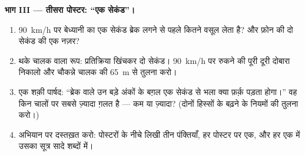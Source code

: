 \begin{problem}[{सप्ताहांत समस्या --- कक्षा क़स्बे का सड़क-सुरक्षा
अभियान बनाती है; सूत्र से जाँचे गए पोस्टर; महापौर के मुश्किल
सवाल}]
\medskip\noindent\textbf{भाग III --- तीसरा पोस्टर: ``एक सेकंड''।}
\begin{enumerate}[resume]
  \item \qty{90}{km/h} पर बेध्यानी का एक सेकंड ब्रेक लगने से पहले
        कितने  वसूल लेता है? और फ़ोन की दो सेकंड की एक नज़र?
  \item थके चालक वाला रूप: प्रतिक्रिया खिंचकर दो सेकंड। \qty{90}{km/h}
        पर रुकने की पूरी दूरी दोबारा निकालो और चौकन्ने चालक की
        \qty{65}{m} से तुलना करो।
  \item एक शक़ी पार्षद: ``ब्रेक वाले उन बड़े अंकों के बग़ल एक सेकंड
        से भला क्या फ़र्क़ पड़ता होगा।'' वह किन चालों पर सबसे ज़्यादा
        ग़लत है --- कम या ज़्यादा? (दोनों हिस्सों के बढ़ने के नियमों की
        तुलना करो।)
  \item अभियान पर दस्तख़त करो: पोस्टरों के नीचे लिखी तीन पंक्तियाँ, हर
        पोस्टर पर एक, और हर एक में उसका सूत्र सादे शब्दों में।
\end{enumerate}
\end{problem}
